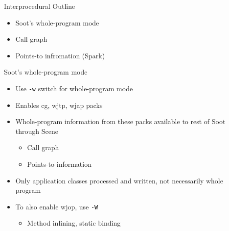 \begin{slide}{Interprocedural Outline}
\begin{itemize}
\item Soot's whole-program mode
\item Call graph
\item Points-to infromation (Spark)
\end{itemize}
\end{slide}

\begin{slide}{Soot's whole-program mode}
\begin{itemize}
\item Use \texttt{-w} switch for whole-program mode
\item Enables cg, wjtp, wjap packs
\item Whole-program information from these packs available to rest of Soot through Scene
\begin{itemize}
\item Call graph
\item Points-to information
\end{itemize}
\item Only application classes processed and written, not necessarily whole program
\item To also enable wjop, use \texttt{-W}
\begin{itemize}
\item Method inlining, static binding
\end{itemize}
\end{itemize}
\end{slide}



